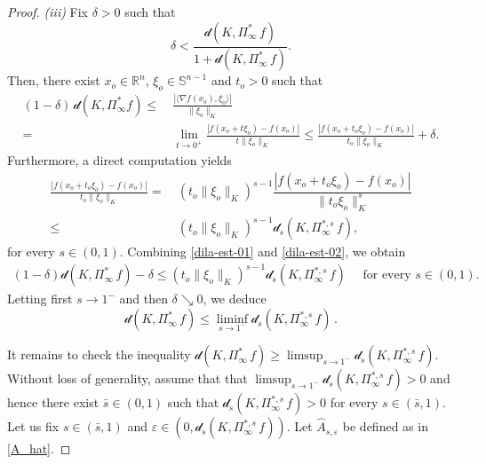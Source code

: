 \documentclass[11pt, reqno]{article}
\theoremstyle{definition}
\numberwithin{equation}{section}
\newcommand{\R}{\mathbb{R}}
\newcommand{\Sphere}{\mathbb{S}^{n - 1}}
\newcommand{\dila}{\mathscr{d}}
\begin{document}
\begin{proof}
\textit{(iii)}
Fix $\delta > 0$ such that
\[
    \delta < \dfrac{\dila(K, \Pi^\ast_\infty \, f)}{1 + \dila(K, \Pi^\ast_\infty \, f)}.
\]
Then, there exist $x_o \in \R^n$, $\xi_o \in \Sphere$ and $t_o > 0$
such that 
    \begin{equation}\label{dila-est-01}
    \begin{split}
	(1 - \delta) \, \dila(K, \Pi^\ast_\infty f)
	\leq & ~ \frac{|\langle \nabla f(x_o), \xi_o \rangle|}{\|\xi_o\|_K}
	\\
    = & ~ \lim_{t \to 0^+} \frac{|f(x_o + t \xi_o) - f(x_o)|}{t \| \xi_o \|_K }
	\leq \frac{|f(x_o + t_o \xi_o) - f(x_o)|}{t_o \| \xi_o \|_K } + \delta.
    \end{split}
	\end{equation}
Furthermore, a direct computation yields
    \begin{equation}\label{dila-est-02}
    \begin{split}
        \frac{|f(x_o + t_o \xi_o) - f(x_o)|}{t_o \| \xi_o \|_K }
        = & ~
        (t_o \| \xi_o \|_K)^{s - 1} \dfrac{|f(x_o + t_o \xi_o) - f(x_o)|}{\|t_o \xi_o \|_K^s}
        \\
        \leq & ~  (t_o \| \xi_o \|_K)^{s - 1} \dila_s(K, \Pi^{\ast, s}_\infty \, f),
    \end{split}
    \end{equation}
for every $s \in (0, 1)$.
Combining \eqref{dila-est-01} and \eqref{dila-est-02}, we obtain
    \begin{align*}
        (1 - \delta) \dila(K, \Pi^\ast_\infty \, f) - \delta
        \leq
         (t_o \| \xi_o \|_K)^{s - 1} \dila_s(K, \Pi^{\ast, s}_\infty \, f) \quad \text{ for every } s \in (0, 1).
    \end{align*}
Letting first $s \to 1^-$ and then $\delta \searrow 0$, we deduce
    \begin{equation}\label{liminf-dila}
        \dila(K, \Pi^\ast_\infty \, f) \leq \liminf_{s \to 1^-}  \dila_s(K, \Pi^{\ast, s}_\infty \, f) \, .
    \end{equation}
    
\medskip


It remains to check the inequality $\dila(K, \Pi^\ast_\infty \, f) \geq \textstyle\limsup_{s \to 1^-} \dila_s(K, \Pi^{\ast, s}_\infty \, f)$.
Without loss of generality, assume that that $\textstyle\limsup_{s \to 1^-} \dila_s(K, \Pi^{\ast, s}_\infty \, f) > 0$ and hence there exist $\bar s \in (0, 1)$ such that $\dila_s(K, \Pi^{\ast, s}_\infty \, f) > 0$ for every $s \in (\bar s, 1)$.
Let us fix $s \in (\bar s, 1)$ and $\varepsilon \in (0, \dila_s(K, \Pi^{\ast, s}_\infty \, f))$.
Let $\widehat  A_{s, \varepsilon}$ be defined as in \eqref{A_hat}.


\end{proof}
\end{document}
